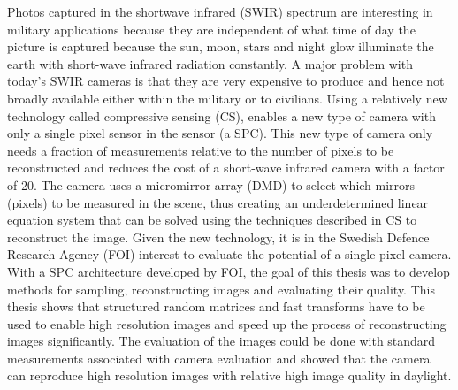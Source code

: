 

Photos captured in the shortwave infrared (SWIR) spectrum are interesting in military applications because they are independent of what time of day the picture is captured because the sun, moon, stars and night glow illuminate the earth with short-wave infrared radiation constantly. A major problem with today's SWIR cameras is that they are very expensive to produce and hence not broadly available either within the military or to civilians. Using a relatively new technology called compressive sensing (CS), enables a new type of camera with only a single pixel sensor in the sensor (a SPC). This new type of camera only needs a fraction of measurements relative to the number of pixels to be reconstructed and reduces the cost of a short-wave infrared camera with a factor of 20. The camera uses a micromirror array (DMD) to select which mirrors (pixels) to be measured in the scene, thus creating an underdetermined linear equation system that can be solved using the techniques described in CS to reconstruct the image. Given the new technology, it is in the Swedish Defence Research Agency (FOI) interest to evaluate the potential of a single pixel camera. With a SPC architecture developed by FOI, the goal of this thesis was to develop methods for sampling, reconstructing images and evaluating their quality. This thesis shows that structured random matrices and fast transforms have to be used to enable high resolution images and speed up the process of reconstructing images significantly. The evaluation of the images could be done with standard measurements associated with camera evaluation and showed that the camera can reproduce high resolution images with relative high image quality in daylight.

